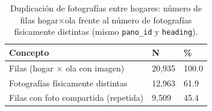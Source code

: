 \begin{table}
\caption{Duplicación de fotografías entre hogares: número de filas hogar×ola frente al número de fotografías físicamente distintas (mismo \texttt{pano\_id} y \texttt{heading}).}
\label{tab:gsv_duplicacion}
\begin{tabular}{lll}
\toprule
Concepto & N & \% \\
\midrule
Filas (hogar × ola con imagen) & 20,935 & 100.0 \\
Fotografías físicamente distintas & 12,963 & 61.9 \\
Filas con foto compartida (repetida) & 9,509 & 45.4 \\
\bottomrule
\end{tabular}
\end{table}
